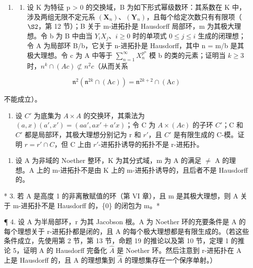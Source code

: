 
\begin{enumerate}
\def\labelenumi{\arabic{enumi}.}
\tightlist
\item
  \begin{enumerate}
  \def\labelenumii{(\alph{enumii})}
  \tightlist
  \item
    设 K 为特征 p \textgreater{} 0 的交换域，B 为如下形式幂级数环：其系数在 K 中，涉及两组无限不定元系 \((\mathbf{X}_{n})\)、\((\mathbf{Y}_{n})\)，且每个给定次数只有有限项（\(\S 2\)，第 12 节）；B 关于 m-进拓扑是 Hausdorff 局部环，m 为其极大理想。令 b 为 B 中由当 \(Y_{i}X_{j}\)、\(i \geqslant 0\) 时的单项式 \(0 \leqslant j \leqslant i\) 生成的闭理想；令 A 为局部环 B/b，它关于 n-进拓扑是 Hausdorff，其中 n = m/b 是其极大理想。令 c 为 A 中等于 \(\sum_{n=1}^{\infty} X_{n}^{p^{n}}\) 模 b 的类的元素；证明当 \(k \geqslant 3\) 时，\(n^{k} \cap (Ac) \not\subset n^{2}c\)（从而关系
  \end{enumerate}
\end{enumerate}

\[
\mathfrak {n} ^ {2} (\mathfrak {n} ^ {2 k} \cap (\mathrm{A} c)) = \mathfrak {n} ^ {2 k + 2} \cap (\mathrm{A} c)
\]

不能成立）。

\begin{enumerate}
\def\labelenumi{(\alph{enumi})}
\setcounter{enumi}{1}
\tightlist
\item
  设 \(C'\) 为底集为 \(A \times A\) 的交换环，其乘法为 \((a, x)(a', x') = (aa', ax' + a'x)\)；令 C 为 \(A \times (Ac)\) 的子环 \(C'\)；C 和 \(C'\) 都是局部环，其极大理想分别记为 r 和 \(r'\)，且 \(C'\) 是有限生成的 C-模。证明 \(r = r' \cap C\)，但 C 上由 \(r'\)-进拓扑诱导的拓扑不是 r-进拓扑。
\end{enumerate}

\begin{enumerate}
\def\labelenumi{\arabic{enumi}.}
\setcounter{enumi}{1}
\tightlist
\item
  设 A 为非域的 Noether 整环，K 为其分式域，m 为 A 的满足 \(\neq\) A 的理想。A 上的 m-进拓扑不是由 K 上的 m-进拓扑诱导的，且后者不是 Hausdorff 的。
\end{enumerate}

* 3. 若 A 是高度 1 的非离散赋值的环（第 VI 章），且 m 是其极大理想，则 A 关于 m-进拓扑不是 Hausdorff 的，\{0\} 的闭包为 m。*

¶ 4. 设 A 为半局部环，r 为其 Jacobson 根。A 为 Noether 环的充要条件是 A 的每个理想关于 r-进拓扑都是闭的，且 A 的每个极大理想都是有限生成的。（若这些条件成立，先使用第 2 节，第 13 节，命题 19 的推论以及第 10 节，定理 1 的推论 5，证明 A 的 Hausdorff 完备化 \(\hat{A}\) 是 Noether 环。然后注意到 r-进拓扑在 A 上是 Hausdorff 的，且 A 的理想集到 \(\hat{A}\) 的理想集存在一个保序单射。）

